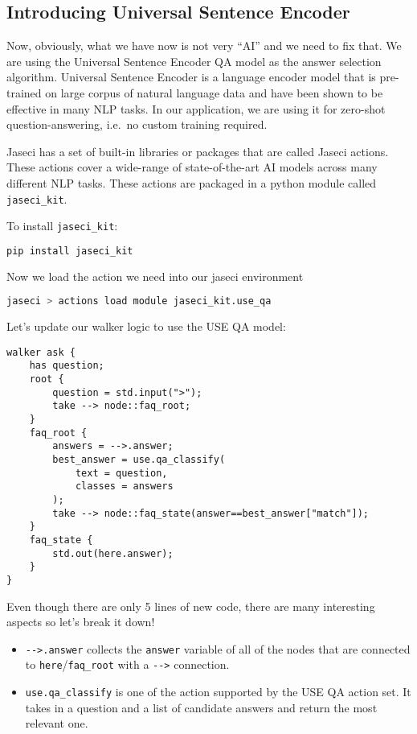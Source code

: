 \subsection{Introducing Universal Sentence
    Encoder}\label{introducing-universal-sentence-encoder}

Now, obviously, what we have now is not very ``AI'' and we need to fix
that. We are using the Universal Sentence Encoder QA model as the answer
selection algorithm. Universal Sentence Encoder is a language encoder
model that is pre-trained on large corpus of natural language data and
have been shown to be effective in many NLP tasks. In our application,
we are using it for zero-shot question-answering, i.e.~no custom
training required.

Jaseci has a set of built-in libraries or packages that are called
Jaseci actions. These actions cover a wide-range of state-of-the-art AI
models across many different NLP tasks. These actions are packaged in a
python module called \lstinline!jaseci_kit!.

To install \lstinline!jaseci_kit!:

\begin{lstlisting}[language=bash]
pip install jaseci_kit
\end{lstlisting}

Now we load the action we need into our jaseci environment

\begin{lstlisting}[language=bash]
jaseci > actions load module jaseci_kit.use_qa
\end{lstlisting}

Let's update our walker logic to use the USE QA model:

\begin{lstlisting}
walker ask {
    has question;
    root {
        question = std.input(">");
        take --> node::faq_root;
    }
    faq_root {
        answers = -->.answer;
        best_answer = use.qa_classify(
            text = question,
            classes = answers
        );
        take --> node::faq_state(answer==best_answer["match"]);
    }
    faq_state {
        std.out(here.answer);
    }
}
\end{lstlisting}

Even though there are only 5 lines of new code, there are many
interesting aspects so let's break it down!

\begin{itemize}
    \tightlist
    \item
          \lstinline!-->.answer! collects the \lstinline!answer! variable of all
          of the nodes that are connected to
          \lstinline!here!/\lstinline!faq_root! with a \lstinline!-->!
          connection.
    \item
          \lstinline!use.qa_classify! is one of the action supported by the USE
          QA action set. It takes in a question and a list of candidate answers
          and return the most relevant one.
\end{itemize}


